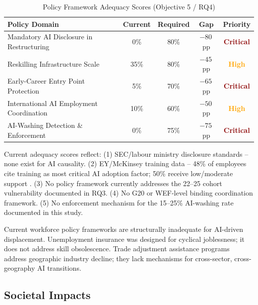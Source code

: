 \documentclass[12pt, a4paper]{article}
\begin{document}
\begin{table}[H]
\centering
\caption{Policy Framework Adequacy Scores (Objective 5 / RQ4)}
\label{tab:policy}
\begin{threeparttable}
\begin{tabular}{@{}lcccc@{}}
\toprule
\textbf{Policy Domain} & \textbf{Current} & \textbf{Required} & \textbf{Gap} & \textbf{Priority} \\
\midrule
Mandatory AI Disclosure in Restructuring & 0\%  & 80\% & $-80$\,pp & \textcolor{darkred}{\textbf{Critical}} \\
Reskilling Infrastructure Scale          & 35\% & 80\% & $-45$\,pp & \textcolor{orange}{\textbf{High}} \\
Early-Career Entry Point Protection      & 5\%  & 70\% & $-65$\,pp & \textcolor{darkred}{\textbf{Critical}} \\
International AI Employment Coordination & 10\% & 60\% & $-50$\,pp & \textcolor{orange}{\textbf{High}} \\
AI-Washing Detection \& Enforcement      & 0\%  & 75\% & $-75$\,pp & \textcolor{darkred}{\textbf{Critical}} \\
\bottomrule
\end{tabular}
\begin{tablenotes}
\small\item Current adequacy scores reflect: (1) SEC/labour ministry disclosure standards -- none exist
for AI causality. (2) EY/McKinsey training data -- 48\% of employees cite training as most critical
AI adoption factor; 50\% receive low/moderate support \citep{ey2025,mckinsey2025}. (3) No policy
framework currently addresses the 22--25 cohort vulnerability documented in RQ3. (4) No G20 or
WEF-level binding coordination framework. (5) No enforcement mechanism for the 15--25\% AI-washing
rate documented in this study.
\end{tablenotes}
\end{threeparttable}
\end{table}

Current workforce policy frameworks are structurally inadequate for AI-driven displacement.
Unemployment insurance was designed for cyclical joblessness; it does not address skill
obsolescence. Trade adjustment assistance programs address geographic industry decline; they
lack mechanisms for cross-sector, cross-geography AI transitions.

\subsection{Societal Impacts}
\end{document}
